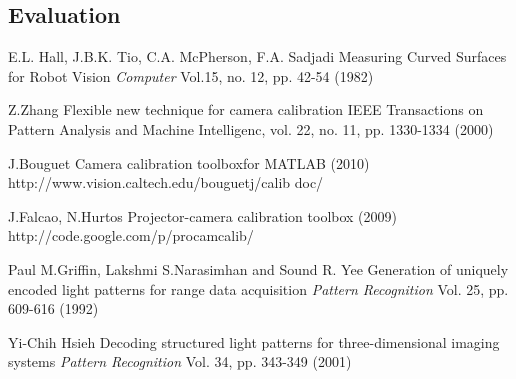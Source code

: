 \documentclass[paper=a4, fontsize=11pt]{scrartcl}
\begin{document}
\subsection{Evaluation}

\begin{thebibliography}{99}
 E.L. Hall, J.B.K. Tio, C.A. McPherson, F.A. Sadjadi
\newblock Measuring Curved Surfaces for Robot Vision
\newblock \emph{Computer} Vol.15, no. 12, pp. 42-54 (1982)

 Z.Zhang
\newblock Flexible new technique for camera calibration
\newblock IEEE Transactions on Pattern Analysis and Machine Intelligenc, vol. 22, no. 11, pp. 1330-1334 (2000)

 J.Bouguet
\newblock Camera calibration toolboxfor MATLAB (2010)
\newblock http://www.vision.caltech.edu/bouguetj/calib doc/

 J.Falcao, N.Hurtos
\newblock Projector-camera calibration toolbox (2009)
\newblock http://code.google.com/p/procamcalib/

 Paul M.Griffin, Lakshmi S.Narasimhan and Sound R. Yee
\newblock Generation of uniquely encoded light patterns for range data acquisition
\newblock \emph{Pattern Recognition} Vol. 25, pp. 609-616 (1992)

 Yi-Chih Hsieh
\newblock Decoding structured light patterns for three-dimensional imaging systems
\newblock \emph{Pattern Recognition} Vol. 34, pp. 343-349 (2001) 

\end{thebibliography}
\end{document}
